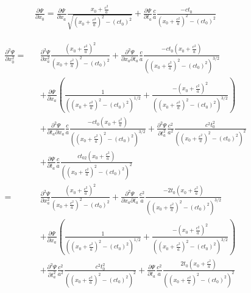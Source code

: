 \documentclass[prd,showpacs,preprint]{revtex4-1}
\begin{document}
\begin{appendix}
\begin{eqnarray}
\frac{\partial \Psi}{\partial x_0} = \frac{\partial \Psi}{\partial x_a}\frac{x_0+\frac{c^2}{a}}{\sqrt{(x_0+\frac{c^2}{a})^2-(ct_0)^2}} + \frac{\partial \Psi}{\partial t_a}\frac{c}{a}\frac{-ct_0}{(x_0+\frac{c^2}{a})^2-(ct_0)^2}
\label{eqn:Partial_Psi_Partial_x}
\end{eqnarray}

\begin{eqnarray}
\frac{\partial^2 \Psi}{\partial x_0^2} =&& \frac{\partial^2 \Psi}{\partial x_a^2}\frac{(x_0+\frac{c^2}{a})^2}{(x_0+\frac{c^2}{a})^2-(ct_0)^2} + \frac{\partial^2 \Psi}{\partial x_a\partial t_a}\frac{c}{a}\frac{-ct_0(x_0+\frac{c^2}{a})}{((x_0+\frac{c^2}{a})^2-(ct_0)^2)^{3/2}}\nonumber\\
&& + \frac{\partial \Psi}{\partial x_a}(\frac{1}{((x_0+\frac{c^2}{a})^2-(ct_0)^2)^{1/2}} + \frac{-(x_0+\frac{c^2}{a})^2}{((x_0+\frac{c^2}{a})^2-(ct_0)^2)^{3/2}})\nonumber\\
&& + \frac{\partial^2 \Psi}{\partial t_a\partial x_a}\frac{c}{a}\frac{-ct_0(x_0+\frac{c^2}{a})}{((x_0+\frac{c^2}{a})^2-(ct_0)^2)^{3/2}} + \frac{\partial^2 \Psi}{\partial t_a^2}\frac{c^2}{a^2}\frac{c^2t_0^2}{((x_0+\frac{c^2}{a})^2-(ct_0)^2)^2}\nonumber\\
&& + \frac{\partial \Psi}{\partial t_a}\frac{c}{a}\frac{ct_02(x_0+\frac{c^2}{a})}{((x_0+\frac{c^2}{a})^2-(ct_0)^2)^2}\nonumber\\
=&& \frac{\partial^2 \Psi}{\partial x_a^2}\frac{(x_0+\frac{c^2}{a})^2}{(x_0+\frac{c^2}{a})^2-(ct_0)^2} + \frac{\partial^2 \Psi}{\partial x_a\partial t_a}\frac{c^2}{a}\frac{-2t_0(x_0+\frac{c^2}{a})}{((x_0+\frac{c^2}{a})^2-(ct_0)^2)^{3/2}}\nonumber\\
&& + \frac{\partial \Psi}{\partial x_a}(\frac{1}{((x_0+\frac{c^2}{a})^2-(ct_0)^2)^{1/2}} + \frac{-(x_0+\frac{c^2}{a})^2}{((x_0+\frac{c^2}{a})^2-(ct_0)^2)^{3/2}})\nonumber\\
&& + \frac{\partial^2 \Psi}{\partial t_a^2}\frac{c^2}{a^2}\frac{c^2t_0^2}{((x_0+\frac{c^2}{a})^2-(ct_0)^2)^2} + \frac{\partial \Psi}{\partial t_a}\frac{c^2}{a}\frac{2t_0(x_0+\frac{c^2}{a})}{((x_0+\frac{c^2}{a})^2-(ct_0)^2)^2}
\label{app:eqn:Partial2_Psi_Partial_x2}
\end{eqnarray}


\end{appendix}
\end{document}
